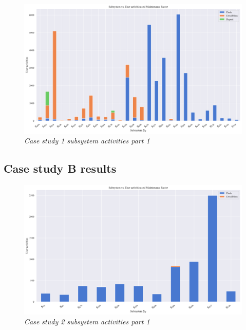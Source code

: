 \begin{figure}[!htb]
	\centering %
	\includegraphics[width=0.95\linewidth]{img/ch3/analysis/case_A_subsystems_1.pdf}
	\caption[Case study 1 subsystem activities part 1]
	{\textit{Case study 1 subsystem activities part 1}}\label{fig:ch3_caseAAnalysis}
\end{figure} 

\subsection{Case study B results}

\begin{figure}[!htb]
	\centering %
	\includegraphics[width=0.95\linewidth]{img/ch3/analysis/case_B_subsystems_1.pdf}
	\caption[Case study 2 subsystem activities part 1]
	{\textit{Case study 2 subsystem activities part 1}}\label{fig:ch3_sbS1S246}
\end{figure} 

